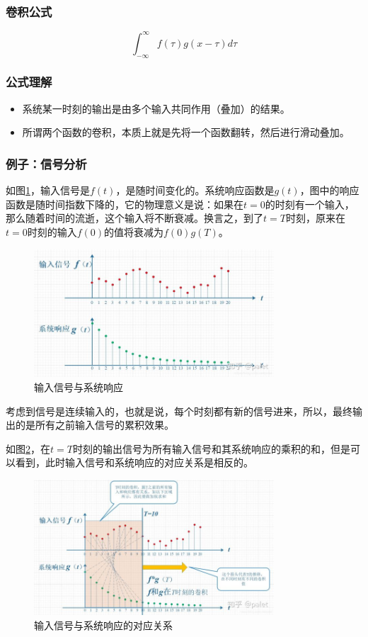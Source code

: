 \documentclass[UTF8]{ctexart}
\begin{document}
\subsubsection{卷积公式}
$$\int_{-\infty}^{\infty}f(\tau)g(x-\tau)d\tau$$
\subsubsection{公式理解}
\begin{itemize}
	\item 系统某一时刻的输出是由多个输入共同作用（叠加）的结果。
	\item 所谓两个函数的卷积，本质上就是先将一个函数翻转，然后进行滑动叠加。
\end{itemize}
\subsubsection{例子：信号分析}
\par 如图\ref{signal1}，输入信号是$f(t)$，是随时间变化的。系统响应函数是$g(t)$，图中的响应函数是随时间指数下降的，它的物理意义是说：如果在$t=0$的时刻有一个输入，那么随着时间的流逝，这个输入将不断衰减。换言之，到了$t=T$时刻，原来在$t=0$时刻的输入$f(0)$的值将衰减为$f(0)g(T)$。
\begin{figure}[htb]
	\centering
	\includegraphics[width=0.80\textwidth]{figures/signal1.jpg}
	\caption{输入信号与系统响应}
	\label{signal1}
\end{figure}
\par 考虑到信号是连续输入的，也就是说，每个时刻都有新的信号进来，所以，最终输出的是所有之前输入信号的累积效果。
\par 如图\ref{signal2}，在$t=T$时刻的输出信号为所有输入信号和其系统响应的乘积的和，但是可以看到，此时输入信号和系统响应的对应关系是相反的。
\begin{figure}[htb]
	\centering
	\includegraphics[width=0.80\textwidth]{figures/signal2.jpg}
	\caption{输入信号与系统响应的对应关系}
	\label{signal2}
\end{figure}
\end{document}
